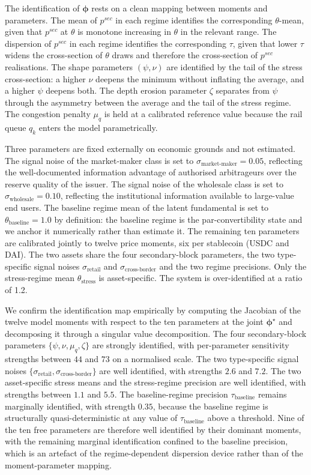 The identification of $\boldsymbol{\phi}$ rests on a clean mapping between moments and parameters. The mean of $p^{sec}$ in each regime identifies the corresponding $\theta$-mean, given that $p^{sec}$ at $\theta$ is monotone increasing in $\theta$ in the relevant range. The dispersion of $p^{sec}$ in each regime identifies the corresponding $\tau$, given that lower $\tau$ widens the cross-section of $\theta$ draws and therefore the cross-section of $p^{sec}$ realisations. The shape parameters $(\psi, \nu)$ are identified by the tail of the stress cross-section: a higher $\nu$ deepens the minimum without inflating the average, and a higher $\psi$ deepens both. The depth erosion parameter $\zeta$ separates from $\psi$ through the asymmetry between the average and the tail of the stress regime. The congestion penalty $\mu_q$ is held at a calibrated reference value because the rail queue $q_k$ enters the model parametrically.

Three parameters are fixed externally on economic grounds and not estimated. The signal noise of the market-maker class is set to $\sigma_{\text{market-maker}} = 0.05$, reflecting the well-documented information advantage of authorised arbitrageurs over the reserve quality of the issuer. The signal noise of the wholesale class is set to $\sigma_{\text{wholesale}} = 0.10$, reflecting the institutional information available to large-value end users. The baseline regime mean of the latent fundamental is set to $\theta_{\text{baseline}} = 1.0$ by definition: the baseline regime is the par-convertibility state and we anchor it numerically rather than estimate it. The remaining ten parameters are calibrated jointly to twelve price moments, six per stablecoin (USDC and DAI). The two assets share the four secondary-block parameters, the two type-specific signal noises $\sigma_{\text{retail}}$ and $\sigma_{\text{cross-border}}$ and the two regime precisions. Only the stress-regime mean $\theta_{\text{stress}}$ is asset-specific. The system is over-identified at a ratio of 1.2.

We confirm the identification map empirically by computing the Jacobian of the twelve model moments with respect to the ten parameters at the joint $\boldsymbol{\phi}^\star$ and decomposing it through a singular value decomposition. The four secondary-block parameters $\{\psi, \nu, \mu_q, \zeta\}$ are strongly identified, with per-parameter sensitivity strengths between $44$ and $73$ on a normalised scale. The two type-specific signal noises $\{\sigma_{\text{retail}}, \sigma_{\text{cross-border}}\}$ are well identified, with strengths $2.6$ and $7.2$. The two asset-specific stress means and the stress-regime precision are well identified, with strengths between $1.1$ and $5.5$. The baseline-regime precision $\tau_{\text{baseline}}$ remains marginally identified, with strength $0.35$, because the baseline regime is structurally quasi-deterministic at any value of $\tau_{\text{baseline}}$ above a threshold. Nine of the ten free parameters are therefore well identified by their dominant moments, with the remaining marginal identification confined to the baseline precision, which is an artefact of the regime-dependent dispersion device rather than of the moment-parameter mapping.

